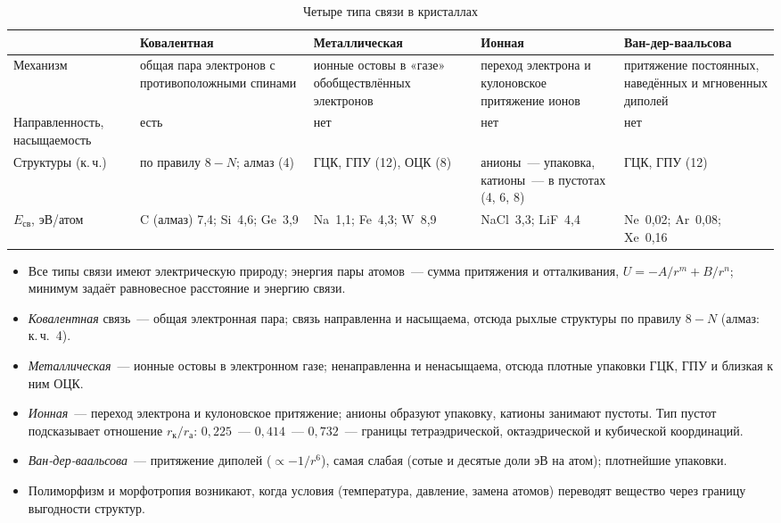 \begin{table}[ht]
\centering
\caption{Четыре типа связи в кристаллах}
\label{tab:bond-compare}
\small
\begin{tabularx}{\textwidth}{@{}>{\raggedright\arraybackslash}p{22mm}*{4}{>{\raggedright\arraybackslash}X}@{}}
\toprule
 & Ковалентная & Металлическая & Ионная & Ван-дер-ваальсова \\
\midrule
Механизм & общая пара электронов с противоположными спинами & ионные остовы в «газе» обобществлённых электронов & переход электрона и кулоновское притяжение ионов & притяжение постоянных, наведённых и мгновенных диполей \\
\addlinespace
Направлен\-ность, насыщае\-мость & есть & нет & нет & нет \\
\addlinespace
Структуры (к.\,ч.) & по правилу $8-N$; алмаз (4) & ГЦК, ГПУ (12), ОЦК (8) & анионы~— упаковка, катионы~— в пустотах (4, 6, 8) & ГЦК, ГПУ (12) \\
\addlinespace
$E_\text{св}$, эВ/атом & C (алмаз) 7,4; Si~4,6; Ge~3,9 & Na~1,1; Fe~4,3; W~8,9 & NaCl~3,3; LiF~4,4 & Ne~0,02; Ar~0,08; Xe~0,16 \\
\bottomrule
\end{tabularx}
\end{table}

\begin{itogi}
\begin{itemize}
\item Все типы связи имеют электрическую природу; энергия пары атомов~—
сумма притяжения и отталкивания, $U=-A/r^m+B/r^n$; минимум задаёт
равновесное расстояние и энергию связи.
\item \emph{Ковалентная} связь~— общая электронная пара; связь
направленна и насыщаема, отсюда рыхлые структуры по правилу $8-N$
(алмаз: к.\,ч.~4).
\item \emph{Металлическая}~— ионные остовы в электронном газе;
ненаправленна и ненасыщаема, отсюда плотные упаковки ГЦК, ГПУ и близкая к
ним ОЦК.
\item \emph{Ионная}~— переход электрона и кулоновское притяжение; анионы
образуют упаковку, катионы занимают пустоты. Тип пустот подсказывает
отношение $r_\text{к}/r_\text{а}$: $0{,}225$~— $0{,}414$~— $0{,}732$~—
границы тетраэдрической, октаэдрической и кубической координаций.
\item \emph{Ван-дер-ваальсова}~— притяжение диполей ($\propto-1/r^6$),
самая слабая (сотые и десятые доли эВ на атом); плотнейшие упаковки.
\item Полиморфизм и морфотропия возникают, когда условия (температура,
давление, замена атомов) переводят вещество через границу выгодности
структур.
\end{itemize}
\end{itogi}

